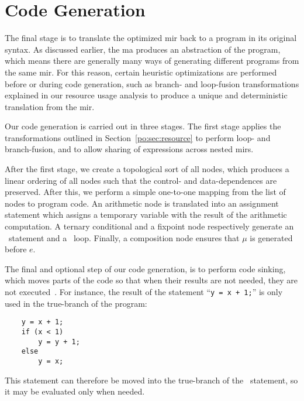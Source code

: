 \section{Code Generation}
\label{po:sec:code_generation}

The final stage is to translate the optimized \gls{mir} back to a program
in its original syntax.  As discussed earlier, the \gls{ma} produces an
abstraction of the program, which means there are generally many ways of
generating different programs from the same \gls{mir}\@.  For this reason,
certain heuristic optimizations are performed before or during code generation,
such as branch- and loop-fusion transformations explained in our resource
usage analysis to produce a unique and deterministic translation from the
\gls{mir}\@.

Our code generation is carried out in three stages.  The first stage applies
the transformations outlined in Section~\ref{po:sec:resource} to perform
loop- and branch-fusion, and to allow sharing of expressions across nested
\glspl{mir}.

After the first stage, we create a topological sort of all nodes, which
produces a linear ordering of all nodes such that the control- and
data-dependences are preserved.  After this, we perform a simple one-to-one
mapping from the list of nodes to program code.  An arithmetic node is
translated into an assignment statement which assigns a temporary variable with
the result of the arithmetic computation.  A ternary conditional and a fixpoint
node respectively generate an \iflit~statement and a \whilelit~loop.  Finally,
a composition node  ensures that $\mu$ is
generated before $e$.

The final and optional step of our code generation, is to perform code sinking,
which moves parts of the code so that when their results are not needed, they
are not executed~\cite{llvm}.  For instance, the result of the statement
``\lstinline[basicstyle=\tt]{y = x + 1;}''
is only used in the true-branch of the program:
\begin{lstlisting}
    y = x + 1;
    if (x < 1)
        y = y + 1;
    else
        y = x;
\end{lstlisting}
This statement can therefore be moved into the true-branch of the
\iflit~statement, so it may be evaluated only when needed.
